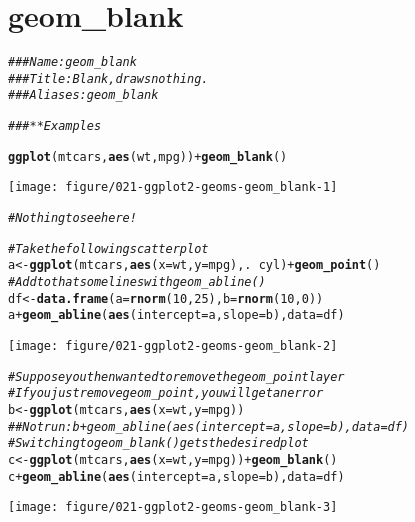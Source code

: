 \documentclass[a4paper,titlepage]{tufte-handout}\usepackage[]{graphicx}\usepackage[]{color}
\makeatletter
\def\maxwidth{ %
  \ifdim\Gin@nat@width>\linewidth
    \linewidth
  \else
    \Gin@nat@width
  \fi
}
\newcommand{\hlnum}[1]{\textcolor[rgb]{0.686,0.059,0.569}{#1}}%
\newcommand{\hlcom}[1]{\textcolor[rgb]{0.678,0.584,0.686}{\textit{#1}}}%
\newcommand{\hlopt}[1]{\textcolor[rgb]{0,0,0}{#1}}%
\newcommand{\hlstd}[1]{\textcolor[rgb]{0.345,0.345,0.345}{#1}}%
\newcommand{\hlkwb}[1]{\textcolor[rgb]{0.69,0.353,0.396}{#1}}%
\newcommand{\hlkwc}[1]{\textcolor[rgb]{0.333,0.667,0.333}{#1}}%
\newcommand{\hlkwd}[1]{\textcolor[rgb]{0.737,0.353,0.396}{\textbf{#1}}}%
\newenvironment{kframe}{%
 \def\at@end@of@kframe{}%
 \ifinner\ifhmode%
  \def\at@end@of@kframe{\end{minipage}}%
  \begin{minipage}{\columnwidth}%
 \fi\fi%
 \def\FrameCommand##1{\hskip\@totalleftmargin \hskip-\fboxsep
 \colorbox{shadecolor}{##1}\hskip-\fboxsep
     \hskip-\linewidth \hskip-\@totalleftmargin \hskip\columnwidth}%
 \MakeFramed {\advance\hsize-\width
   \@totalleftmargin\z@ \linewidth\hsize
   \@setminipage}}%
 {\par\unskip\endMakeFramed%
 \at@end@of@kframe}
\newenvironment{knitrout}{}{} %
\makeatother
\begin{document}
\section{geom\_blank}

\begin{knitrout}
\color{fgcolor}\begin{kframe}
\begin{alltt}
\hlcom{### Name: geom_blank}
\hlcom{### Title: Blank, draws nothing.}
\hlcom{### Aliases: geom_blank}

\hlcom{### ** Examples}

\hlkwd{ggplot}\hlstd{(mtcars,} \hlkwd{aes}\hlstd{(wt, mpg))} \hlopt{+} \hlkwd{geom_blank}\hlstd{()}
\end{alltt}
\end{kframe}
\texttt{[image: figure/021-ggplot2-geoms-geom\_blank-1]} 
\begin{kframe}\begin{alltt}
\hlcom{# Nothing to see here!}

\hlcom{# Take the following scatter plot}
\hlstd{a} \hlkwb{<-} \hlkwd{ggplot}\hlstd{(mtcars,} \hlkwd{aes}\hlstd{(}\hlkwc{x} \hlstd{= wt,} \hlkwc{y} \hlstd{= mpg), .} \hlopt{~} \hlstd{cyl)} \hlopt{+} \hlkwd{geom_point}\hlstd{()}
\hlcom{# Add to that some lines with geom_abline()}
\hlstd{df} \hlkwb{<-} \hlkwd{data.frame}\hlstd{(}\hlkwc{a} \hlstd{=} \hlkwd{rnorm}\hlstd{(}\hlnum{10}\hlstd{,} \hlnum{25}\hlstd{),} \hlkwc{b} \hlstd{=} \hlkwd{rnorm}\hlstd{(}\hlnum{10}\hlstd{,} \hlnum{0}\hlstd{))}
\hlstd{a} \hlopt{+} \hlkwd{geom_abline}\hlstd{(}\hlkwd{aes}\hlstd{(}\hlkwc{intercept} \hlstd{= a,} \hlkwc{slope} \hlstd{= b),} \hlkwc{data} \hlstd{= df)}
\end{alltt}
\end{kframe}
\texttt{[image: figure/021-ggplot2-geoms-geom\_blank-2]} 
\begin{kframe}\begin{alltt}
\hlcom{# Suppose you then wanted to remove the geom_point layer}
\hlcom{# If you just remove geom_point, you will get an error}
\hlstd{b} \hlkwb{<-} \hlkwd{ggplot}\hlstd{(mtcars,} \hlkwd{aes}\hlstd{(}\hlkwc{x} \hlstd{= wt,} \hlkwc{y} \hlstd{= mpg))}
\hlcom{## Not run: b + geom_abline(aes(intercept = a, slope = b), data = df)}
\hlcom{# Switching to geom_blank() gets the desired plot}
\hlstd{c} \hlkwb{<-} \hlkwd{ggplot}\hlstd{(mtcars,} \hlkwd{aes}\hlstd{(}\hlkwc{x} \hlstd{= wt,} \hlkwc{y} \hlstd{= mpg))} \hlopt{+} \hlkwd{geom_blank}\hlstd{()}
\hlstd{c} \hlopt{+} \hlkwd{geom_abline}\hlstd{(}\hlkwd{aes}\hlstd{(}\hlkwc{intercept} \hlstd{= a,} \hlkwc{slope} \hlstd{= b),} \hlkwc{data} \hlstd{= df)}
\end{alltt}
\end{kframe}
\texttt{[image: figure/021-ggplot2-geoms-geom\_blank-3]} 

\end{knitrout}
\end{document}
